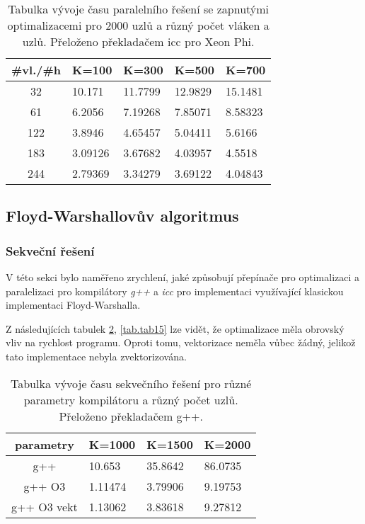 \documentclass[a4paper,11pt]{article}
\begin{document}
        \begin{table}[ht]
  \begin{center}
   \begin{tabular}{|c|l|l|l|l|}
    \hline 
    \#vl./\#h & K=100 & K=300 & K=500 & K=700\\
   \hline 
   \hline 
   32 & 10.171 & 11.7799 & 12.9829 & 15.1481\\
   \hline
    61 & 6.2056 & 7.19268 & 7.85071 & 8.58323\\
   \hline
    122 & 3.8946 & 4.65457 & 5.04411 & 5.6166\\
   \hline
    183 & 3.09126 & 3.67682 & 4.03957 & 4.5518\\
   \hline
    244 & 2.79369 & 3.34279 & 3.69122 & 4.04843\\
   \hline    
    \end{tabular}
   \caption{Tabulka vývoje času paralelního řešení se zapnutými optimalizacemi pro 2000 uzlů a různý počet vláken a uzlů. Přeloženo 
   překladačem icc pro Xeon Phi.} 
   \label{tab.tab13}
  \end{center}   
  \end{table}
  
\subsection{Floyd-Warshallovův algoritmus}

\subsubsection{Sekveční řešení}
V této sekci bylo naměřeno zrychlení, jaké způsobují přepínače pro optimalizaci a paralelizaci pro kompilátory
 \textit{g++} a \textit{icc} pro implementaci využívající klasickou implementaci Floyd-Warshalla.
 
 Z následujících tabulek \ref{tab.tab14}, \ref{tab.tab15} lze vidět, že optimalizace měla obrovský vliv na rychlost programu. Oproti tomu, vektorizace
 neměla vůbec žádný, jelikož tato implementace nebyla zvektorizována.
 
 \begin{table}[ht]
  \begin{center}
   \begin{tabular}{|c|l|l|l|}
    \hline 
    parametry & K=1000 & K=1500 & K=2000\\
   \hline 
   \hline 
   g++ & 10.653 & 35.8642 & 86.0735\\
   \hline
    g++ O3 & 1.11474 & 3.79906 & 9.19753\\
    \hline
    g++ O3 vekt & 1.13062 & 3.83618 & 9.27812\\
    \hline
    \end{tabular}
   \caption{Tabulka vývoje času sekvečního řešení pro různé parametry kompilátoru a různý počet uzlů. Přeloženo 
   překladačem g++.} 
   \label{tab.tab14}
  \end{center}   
  \end{table}
  
\end{document}
